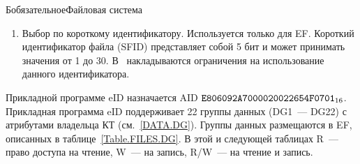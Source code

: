 \begin{appendix}{Б}{обязательное}{Файловая система}
\begin{enumerate}
\item
Выбор по короткому идентификатору. Используется только для EF. Короткий
идентификатор файла (SFID) представляет собой 5 бит и может принимать значения
от 1 до 30. В~\cite{APDU} накладываются ограничения на использование данного
идентификатора.
\end{enumerate}


Прикладной программе eID назначается AID $\texttt{E806092A7000020022654F0701}_{16}$. 
%
Прикладная программа eID поддерживает 22 группы 
данных (DG1~--- DG22) с атрибутами владельца КТ (см.~\ref{DATA.DG}). 
%
Группы данных размещаются в EF, описанных в таблице~\ref{Table.FILES.DG}. 
%
В этой и следующей таблицах R~--- право доступа на чтение, W~--- на запись,  
R/W~--- на чтение и запись.
 

\end{appendix}
